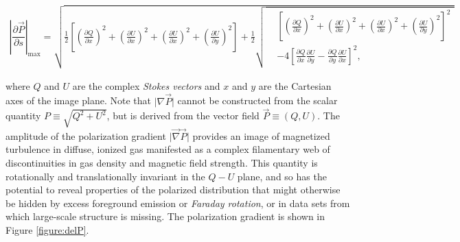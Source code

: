\documentclass[a4paper,10pt]{article}
\begin{document}
\begin{equation*}
\begin{split}
\left\lvert\dfrac{\partial\vec{P}}{\partial s}\right\rvert_\mathrm{max} = \sqrt{ \frac{1}{2}\left[ \left(\frac{\partial Q}{\partial x}\right)^2 + \left(\frac{\partial U}{\partial x}\right)^2 + \left(\frac{\partial U}{\partial x}\right)^2 + \left(\frac{\partial U}{\partial y}\right)^2 \right] + \frac{1}{2} 
  \sqrt{
    \begin{aligned}
    & \left[ \left(\frac{\partial Q}{\partial x}\right)^2 + \left(\frac{\partial U}{\partial x}\right)^2 + \left(\frac{\partial U}{\partial x}\right)^2 + \left(\frac{\partial U}{\partial y}\right)^2 \right]^2 \\
    &- 4\left[ \frac{\partial Q}{\partial x}\frac{\partial U}{\partial y} - \frac{\partial Q}{\partial y}\frac{\partial U}{\partial x}  \right]^2,
    \end{aligned}
    }}
\end{split}
\end{equation*}

{\noindent}where $Q$ and $U$ are the complex \textit{Stokes vectors} and $x$ and $y$ are the Cartesian axes of the image plane. Note that $\lvert\nabla\vec{P}\rvert$ cannot be constructed from the scalar quantity $P\equiv\sqrt{Q^2+U^2}$, but is derived from the vector field $\vec{P}\equiv(Q,U)$. The amplitude of the polarization gradient $\lvert\vec\nabla\vec{P}\rvert$ provides an image of magnetized turbulence in diffuse, ionized gas manifested as a complex filamentary web of discontinuities in gas density and magnetic field strength. This quantity is rotationally and translationally invariant in the $Q-U$ plane, and so has the potential to reveal properties of the polarized distribution that might otherwise be hidden by excess foreground emission or \textit{Faraday rotation}, or in data sets from which large-scale structure is missing. The polarization gradient is shown in Figure \ref{figure:delP}.
\end{document}
